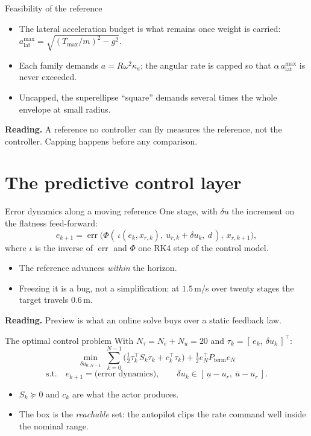 \documentclass[10pt]{beamer}
\newcommand{\takeaway}[1]{\par\vfill{\footnotesize\textbf{Reading.} #1\par}}
\begin{document}
\begin{frame}{Feasibility of the reference}
  \begin{itemize}
    \item The lateral acceleration budget is what remains once weight is
      carried:
      $a_{\mathrm{lat}}^{\max}=\sqrt{(T_{\max}/m)^{2}-g^{2}}$.
    \item Each family demands $a=R\omega^{2}\kappa_a$; the angular rate is
      capped so that $\alpha\,a_{\mathrm{lat}}^{\max}$ is never exceeded.
    \item Uncapped, the superellipse ``square'' demands several times the
      whole envelope at small radius.
  \end{itemize}
  \takeaway{A reference no controller can fly measures the reference, not the
    controller. Capping happens before any comparison.}
\end{frame}

\section{The predictive control layer}

\begin{frame}{Error dynamics along a moving reference}
  One stage, with $\delta u$ the increment on the flatness feed-forward:
  \[
    e_{k+1}=\operatorname{err}\!\big(
      \Phi(\,\iota(e_k,x_{r,k}),\ u_{r,k}+\delta u_k,\ d\,),\ x_{r,k+1}\big),
  \]
  where $\iota$ is the inverse of $\operatorname{err}$ and $\Phi$ one RK4 step
  of the control model.
  \begin{itemize}
    \item The reference advances \emph{within} the horizon.
    \item Freezing it is a bug, not a simplification: at $1.5\,$m/s over
      twenty stages the target travels $0.6\,$m.
  \end{itemize}
  \takeaway{Preview is what an online solve buys over a static feedback law.}
\end{frame}

\begin{frame}{The optimal control problem}
  With $N_\tau=N_e+N_u=20$ and $\tau_k=[\,e_k,\ \delta u_k\,]^{\!\top}$:
  \[
    \min_{\delta u_{0:N-1}}\
      \sum_{k=0}^{N-1}\Big(\tfrac12\tau_k^{\!\top}S_k\tau_k
        +c_k^{\!\top}\tau_k\Big)
      +\tfrac12 e_N^{\!\top}P_{\mathrm{term}}e_N
  \]
  \[
    \text{s.t.}\quad e_{k+1}=\text{(error dynamics)},
    \qquad \delta u_k\in[\,\underline u-u_r,\ \overline u-u_r\,].
  \]
  \begin{itemize}
    \item $S_k\succeq0$ and $c_k$ are what the actor produces.
    \item The box is the \emph{reachable} set: the autopilot clips the rate
      command well inside the nominal range.
  \end{itemize}
\end{frame}
\end{document}
